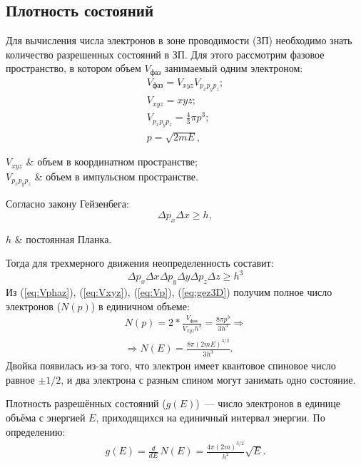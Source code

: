 \subsection{Плотность состояний}
Для вычисления числа электронов в зоне проводимости (ЗП) необходимо знать количество разрешенных состояний в ЗП. Для этого рассмотрим фазовое пространство, в котором объем $V_{\text{фаз}}$ занимаемый одним электроном:
\begin{gather}
	\label{eq:Vphaz}
 	V_{\text{фаз}} = V_{xyz}V_{p_{x}p_{y}p_{z}};\\
	\label{eq:Vxyz}
 	V_{xyz} = xyz;\\
 	\label{eq:Vp}
 	V_{p_{x}p_{y}p_{z}} = \frac{4}{3}\pi p^{3};\\
 	\label{eq:p}
 	p = \sqrt{2mE},
\end{gather} 
\begin{conditions}
	$V_{xyz}$ & объем в координатном пространстве;\\
	$V_{p_{x}p_{y}p_{z}}$ & объем в импульсном пространстве. 
\end{conditions}
Согласно закону Гейзенбега:
\begin{equation}
	\label{eq:gez}
	\Delta p_{x} \Delta x \geq h,
\end{equation}
\begin{conditions}
	$h$ & постоянная Планка.
\end{conditions}
Тогда для трехмерного движения неопределенность составит:
\begin{equation}
	\label{eq:gez3D}
	\Delta p_{x} \Delta x \Delta p_{y} \Delta y\Delta p_{z} \Delta z\geq h^{3}
\end{equation}
Из (\ref{eq:Vphaz}), (\ref{eq:Vxyz}), (\ref{eq:Vp}), (\ref{eq:gez3D}) получим полное число электронов ($N(p)$) в единичном объеме:
\begin{gather}
	N(p) = 2* \frac{V_{\text{фаз}}}{V_{xyz}h^{3}} = \frac{8\pi p^{3}}{3h^{3}} \Rightarrow \\
	\Rightarrow N(E) =  \frac{8\pi (2mE)^{3/2}}{3h^{3}}.
\end{gather}
Двойка появилась из-за того, что электрон имеет квантовое спиновое число равное $\pm 1/2$, и два электрона с разным спином могут занимать одно состояние.

Плотность разрешённых состояний ($g(E)$)~--- число электронов в единице объёма с энергией $E$, приходящихся на единичный интервал энергии. По определению:
\begin{gather}
	g(E) = \frac{d}{dE}\,N(E) = \frac{4\pi (2m)^{3/2}}{h^{2}}\sqrt{E}.
\end{gather}


